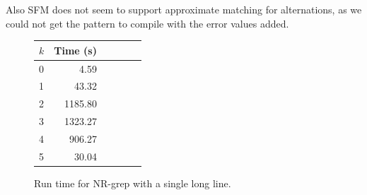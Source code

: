 Also SFM does not seem to support approximate matching for alternations, as we
could not get the pattern to compile with the error values added.

\begin{figure}[!ht]
    \centering
    \begin{tabular}{l|rrrrr}
        $k$ & Time (s)\\\hline
        0   & 4.59\\
        1   & 43.32\\
        2   & 1185.80\\
        3   & 1323.27\\
        4   & 906.27\\
        5   & 30.04\\
    \end{tabular}
    \caption{Run time for NR-grep with a single long line.}
    \label{fig:nr-longline}
\end{figure}


